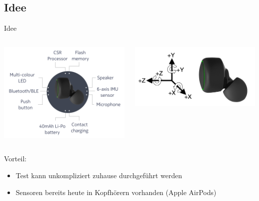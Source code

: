 \documentclass[18pt]{beamer}
\begin{document}
\subsection{Idee}
\begin{frame}{Idee}
    \begin{columns}[T] %
	\begin{column}{.48\textwidth}
	    \includegraphics[scale=0.15]{../Proposal/logos/esense}
	\end{column}%
	\hfill%
	\begin{column}{.48\textwidth}
	    \includegraphics[scale=0.25]{../Proposal/logos/esense2}
	\end{column}%
	\end{columns}
	Vorteil:
	\begin{itemize}
		\item Test kann unkompliziert zuhause durchgeführt werden
		\item Sensoren bereits heute in Kopfhörern vorhanden (Apple AirPods)
	\end{itemize}
\end{frame}
\end{document}

